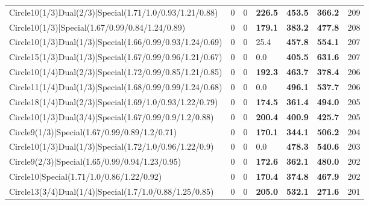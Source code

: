 \begin{tabular}{lrrlllr}
 Circle10(1/3)Dual(2/3)|Special(1.71/1.0/0.93/1.21/0.88)        &          0   &            0   & \textbf{226.5} & \textbf{453.5} & \textbf{366.2} &          209 \\
 Circle10(1/3)|Special(1.67/0.99/0.84/1.24/0.89)                &          0   &            0   & \textbf{179.1} & \textbf{383.2} & \textbf{477.8} &          208 \\
 Circle10(1/3)Dual(1/3)|Special(1.66/0.99/0.93/1.24/0.69)       &          0   &            0   & 25.4           & \textbf{457.8} & \textbf{554.1} &          207 \\
 Circle15(1/3)Dual(1/3)|Special(1.67/0.99/0.96/1.21/0.67)       &          0   &            0   & 0.0            & \textbf{405.5} & \textbf{631.6} &          207 \\
 Circle10(1/4)Dual(2/3)|Special(1.72/0.99/0.85/1.21/0.85)       &          0   &            0   & \textbf{192.3} & \textbf{463.7} & \textbf{378.4} &          206 \\
 Circle11(1/4)Dual(1/3)|Special(1.68/0.99/0.99/1.24/0.68)       &          0   &            0   & 0.0            & \textbf{496.1} & \textbf{537.7} &          206 \\
 Circle18(1/4)Dual(2/3)|Special(1.69/1.0/0.93/1.22/0.79)        &          0   &            0   & \textbf{174.5} & \textbf{361.4} & \textbf{494.0} &          205 \\
 Circle10(1/3)Dual(3/4)|Special(1.67/0.99/0.9/1.2/0.88)         &          0   &            0   & \textbf{200.4} & \textbf{400.9} & \textbf{425.7} &          205 \\
 Circle9(1/3)|Special(1.67/0.99/0.89/1.2/0.71)                  &          0   &            0   & \textbf{170.1} & \textbf{344.1} & \textbf{506.2} &          204 \\
 Circle10(1/3)Dual(1/3)|Special(1.72/1.0/0.96/1.22/0.9)         &          0   &            0   & 0.0            & \textbf{478.3} & \textbf{540.6} &          203 \\
 Circle9(2/3)|Special(1.65/0.99/0.94/1.23/0.95)                 &          0   &            0   & \textbf{172.6} & \textbf{362.1} & \textbf{480.0} &          202 \\
 Circle10|Special(1.71/1.0/0.86/1.22/0.92)                      &          0   &            0   & \textbf{170.4} & \textbf{374.8} & \textbf{467.9} &          202 \\
 Circle13(3/4)Dual(1/4)|Special(1.7/1.0/0.88/1.25/0.85)         &          0   &            0   & \textbf{205.0} & \textbf{532.1} & \textbf{271.6} &          201 \\

\end{tabular}
